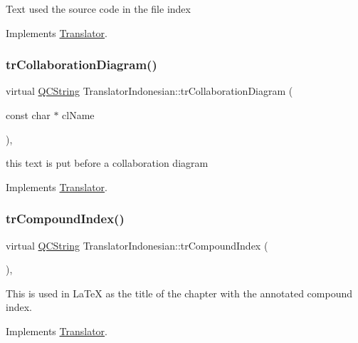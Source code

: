 Text used the source code in the file index 

Implements \mbox{\hyperlink{class_translator}{Translator}}.

\mbox{\label{class_translator_indonesian_ae7775c0e675f026743c0be1f51e844bf}} 
\subsubsection{\texorpdfstring{trCollaborationDiagram()}{trCollaborationDiagram()}}
{\footnotesize\ttfamily virtual \mbox{\hyperlink{class_q_c_string}{Q\+C\+String}} Translator\+Indonesian\+::tr\+Collaboration\+Diagram (\begin{DoxyParamCaption}\item[{const char $\ast$}]{cl\+Name }\end{DoxyParamCaption})\hspace{0.3cm}{\ttfamily [inline]}, {\ttfamily [virtual]}}

this text is put before a collaboration diagram 

Implements \mbox{\hyperlink{class_translator}{Translator}}.

\mbox{\label{class_translator_indonesian_acfb32e549f969072d79fcfc58038a2b0}} 
\subsubsection{\texorpdfstring{trCompoundIndex()}{trCompoundIndex()}}
{\footnotesize\ttfamily virtual \mbox{\hyperlink{class_q_c_string}{Q\+C\+String}} Translator\+Indonesian\+::tr\+Compound\+Index (\begin{DoxyParamCaption}{ }\end{DoxyParamCaption})\hspace{0.3cm}{\ttfamily [inline]}, {\ttfamily [virtual]}}

This is used in La\+TeX as the title of the chapter with the annotated compound index. 

Implements \mbox{\hyperlink{class_translator}{Translator}}.


